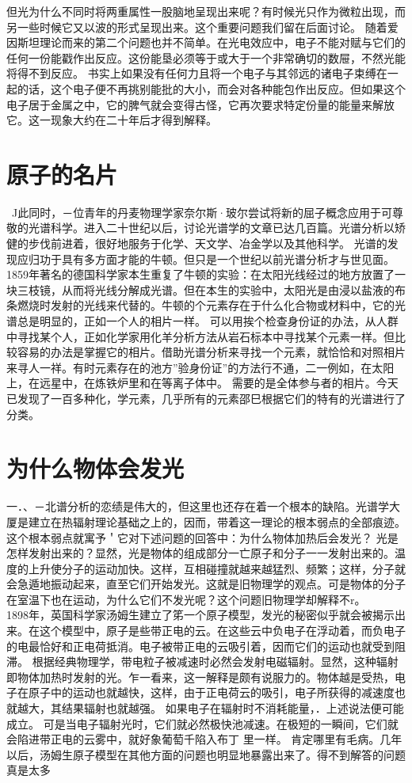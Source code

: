 但光为什么不同时将两重属性一股脑地呈现出来呢？有时候光只作为微粒出现，而另一些时候它又以波的形式呈现出来。这个重要问题我们留在后面讨论。
随着爱因斯坦理论而来的第二个问题也并不简单。在光电效应中，电子不能对赋与它们的任何一份能戳作出反应。这份能垦必须等于或大于一个非常确切的数屉，不然光能将得不到反应。
书实上如果没有任何力且将一个电子与其邻远的诸电子束缚在一起的话，这个电子便不再挑别能批的大小，而会对各种能包作出反应。但如果这个电子居于金属之中，它的脾气就会变得古怪，它再次要求特定份量的能量来解放它。这一现象大约在二十年后才得到解释。

\section{原子的名片}

~J此同时，－位青年的丹麦物理学家奈尔斯·玻尔尝试将新的屈子概念应用于可尊敬的光谱科学。进入二十世纪以后，讨论光谱学的文章已达几百篇。光谱分析以矫健的步伐前进着，很好地服务于化学、天文学、冶金学以及其他科学。
光谱的发现应归功于具有多方面才能的牛顿。但只是一个世纪以前光谱分析才与世见面。1859年著名的德国科学家本生重复了牛顿的实验：在太阳光线经过的地方放置了一块三枝镜，从而将光线分解成光谱。但在本生的实验中，太阳光是由浸以盐液的布条燃烧时发射的光线来代替的。牛顿的个元素存在于什么化合物或材料中，它的光谱总是明显的，正如一个人的相片一样。
可以用挨个检查身份证的办法，从人群中寻找某个人，正如化学家用化羊分析方法从岩石标本中寻找某个元素一样。但比较容易的办法是掌握它的相片。借助光谱分析来寻找一个元素，就恰恰和对照相片来寻人一祥。有时元素存在的池方”验身份证”的方法行不通，二一例如，在太阳上，在远星中，在炼铁炉里和在等离子体中。
需要的是全体参与者的相片。今天已发现了一百多种化，学元素，几乎所有的元素邵巳根据它们的特有的光谱进行了分类。

\section{为什么物体会发光}

一．、－北谱分析的恋绩是伟大的，但这里也还存在着一个根本的缺陷。光谱学大厦是建立在热辐射理论基础之上的，因而，带着这一理论的根本弱点的全部痕迹。这个根本弱点就寓予＇它对下述问题的回答中：为什么物体加热后会发光？
光是怎样发射出来的？显然，光是物体的组成部分一亡原子和分子一一发射出来的。温度的上升使分子的运动加快。这样，互相碰撞就越来越猛烈、频繁；这样，分子就会急遁地振动起来，直至它们开始发光。这就是旧物理学的观点。可是物体的分子在室温下也在运动，为什么它们不发光呢？这个问题旧物理学却解释不r。
  
1898年，英国科学家汤姆生建立了笫一个原子模型，发光的秘密似乎就会被揭示出来。在这个模型中，原子是些带正电的云。在这些云中负电子在浮动着，而负电子的电最恰好和正电荷抵消。电子被带正电的云吸引着，因而它们的运动也就受到阻滞。
根据经典物理学，带电粒子被减速时必然会发射电磁辐射。显然，这种辐射即物体加热时发射的光。乍一看来，这一解释是颇有说服力的。物体越是受热，电子在原子中的运动也就越快，这样，由于正电荷云的吸引，电子所获得的减速度也就越大，其结果辐射也就越强。
如果电子在辐射时不消耗能量，．上述说法便可能成立。
可是当电子辐射光时，它们就必然极快池减速。在极短的一瞬间，它们就会陷进带正电的云雾中，就好象葡萄千陷入布丁
里一样。
肯定哪里有毛病。几年以后，汤姆生原子模型在其他方面的问题也明显地暴露出来了。得不到解答的问题真是太多

